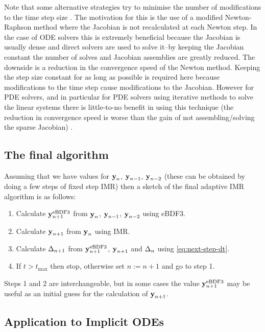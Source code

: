 Note that some alternative strategies try to minimise the number of modifications to the time step size \cite[chap. 6]{Iserles2009} \cite[Sec. 2.1]{cvode-manual}.
The motivation for this is the use of a modified Newton-Raphson method where the Jacobian is not recalculated at each Newton step.
In the case of ODE solvers this is extremely beneficial because the Jacobian is usually dense and direct solvers are used to solve it--by keeping the Jacobian constant the number of solves and Jacobian assemblies are greatly reduced.
The downside is a reduction in the convergence speed of the Newton method.
Keeping the step size constant for as long as possible is required here because modifications to the time step cause modifications to the Jacobian.
However for PDE solvers, and in particular for PDE solvers using iterative methods to solve the linear systems there is little-to-no benefit in using this technique (the reduction in convergence speed is worse than the gain of not assembling/solving the sparse Jacobian) \cite[128]{Iserles2009}.


\subsection{The final algorithm}

Assuming that we have values for $\boldsymbol{\mathrm{y}}_n$, $\boldsymbol{\mathrm{y}}_{n-1}$, $\boldsymbol{\mathrm{y}}_{n-2}$ (these can be obtained \eg by doing a few steps of fixed step IMR) then a sketch of the final adaptive IMR algorithm is as follows:
\begin{enumerate}
\item Calculate $\boldsymbol{\mathrm{y}}_{n+1}^{\mathrm{eBDF3}}$ from $\boldsymbol{\mathrm{y}}_n$, $\boldsymbol{\mathrm{y}}_{n-1}$, $\boldsymbol{\mathrm{y}}_{n-2}$ using eBDF3.
\item Calculate $\boldsymbol{\mathrm{y}}_{n+1}$ from $\boldsymbol{\mathrm{y}}_n$ using IMR.
\item Calculate $\Delta_{n+1}$ from $\boldsymbol{\mathrm{y}}_{n+1}^{\mathrm{eBDF3}}$, $\boldsymbol{\mathrm{y}}_{n+1}$ and $\Delta_{n}$ using
  \cref{eq:next-step-dt}.
\item If $t > t_{\text{max}}$ then stop, otherwise set $n := n+1$ and go to step 1.
\end{enumerate}

Steps 1 and 2 are interchangeable, but in some cases the value $\boldsymbol{\mathrm{y}}_{n+1}^{\mathrm{eBDF3}}$ may be useful as an initial guess for the calculation of $\boldsymbol{\mathrm{y}}_{n+1}$.


\subsection{Application to Implicit ODEs}
\label{sec:extens-impl-odes}

